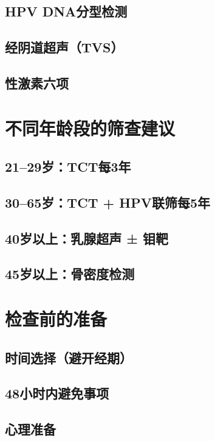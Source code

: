 \begin{enumerate}
\subsection{HPV DNA分型检测}
\subsection{经阴道超声（TVS）}
\subsection{性激素六项}

\section{不同年龄段的筛查建议}
\subsection{21--29岁：TCT每3年}
\subsection{30--65岁：TCT + HPV联筛每5年}
\subsection{40岁以上：乳腺超声 ± 钼靶}
\subsection{45岁以上：骨密度检测}

\section{检查前的准备}
\subsection{时间选择（避开经期）}
\subsection{48小时内避免事项}
\subsection{心理准备}


\end{enumerate}
